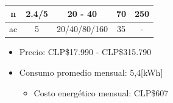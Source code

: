 \documentclass[mathserif]{beamer}
\begin{document}
\begin{frame}
\begin{table}[H]
{\begin{tabular}{|c|c|c|c|c|}
n                                                           & 2.4/5                                                          & 20 - 40                                                         & 70                                                                         & 250                                                                        \\ \hline
ac                                                          & 5                                                              & 20/40/80/160                                                    & 35                                                                         & -                                                                          \\ \hline
\end{tabular}
}
\end{table}


\begin{itemize}
\pause
\item Precio: CLP\$17.990 - CLP\$315.790
\pause
\item Consumo promedio mensual: 5,4[kWh]
\begin{itemize}
\pause
\item Costo energético mensual: CLP\$607
\end{itemize}
\end{itemize}

\end{frame}


\end{document}
